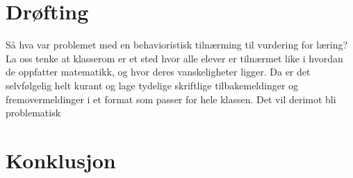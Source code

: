 \documentclass[main.tex]{subfiles}
\begin{document}
\section*{Drøfting}
\label{sec:5}
Så hva var problemet med en behavioristisk tilnærming til vurdering for læring? La oss tenke at klasserom er et sted hvor 
alle elever er tilnærmet like i hvordan de oppfatter matematikk, og hvor deres vanskeligheter ligger. Da er det
selvfølgelig helt kurant og lage tydelige skriftlige tilbakemeldinger og fremovermeldinger i et format som passer for 
hele klassen. Det vil derimot bli problematisk


\section*{Konklusjon}
\label{sec:6}
\end{document}

